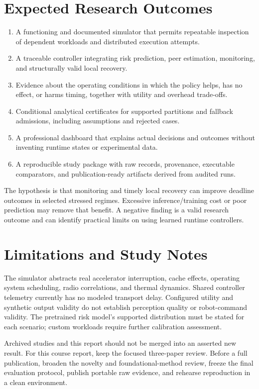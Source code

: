 \documentclass[11pt,a4paper]{article}
\begin{document}
\section{Expected Research Outcomes}
\begin{enumerate}
\item A functioning and documented simulator that permits repeatable inspection
of dependent workloads and distributed execution attempts.
\item A traceable controller integrating risk prediction, peer estimation,
monitoring, and structurally valid local recovery.
\item Evidence about the operating conditions in which the policy helps, has no
effect, or harms timing, together with utility and overhead trade-offs.
\item Conditional analytical certificates for supported partitions and fallback
admissions, including assumptions and rejected cases.
\item A professional dashboard that explains actual decisions and outcomes
without inventing runtime states or experimental data.
\item A reproducible study package with raw records, provenance, executable
comparators, and publication-ready artifacts derived from audited runs.
\end{enumerate}
The hypothesis is that monitoring and timely local recovery can improve deadline
outcomes in selected stressed regimes. Excessive inference/training cost or poor
prediction may remove that benefit. A negative finding is a valid research
outcome and can identify practical limits on using learned runtime controllers.

\section{Limitations and Study Notes}
The simulator abstracts real accelerator interruption, cache effects, operating
system scheduling, radio correlations, and thermal dynamics. Shared controller
telemetry currently has no modeled transport delay. Configured utility and
synthetic output validity do not establish perception quality or robot-command
validity. The pretrained risk model's supported distribution must be stated for
each scenario; custom workloads require further calibration assessment.

Archived studies and this report should not be merged into an asserted
new result. For this course report, keep the focused three-paper review. Before a full
publication, broaden the novelty and foundational-method review, freeze the final
evaluation protocol, publish portable raw evidence, and rehearse reproduction
in a clean environment.
\end{document}
